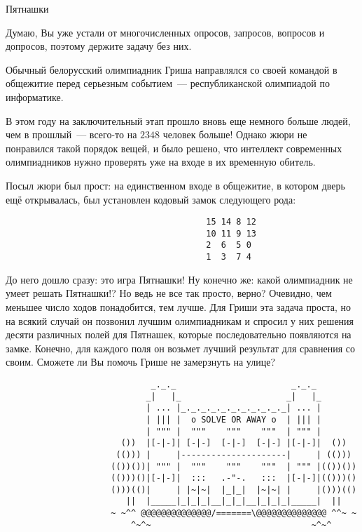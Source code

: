 \begin{problem}{Пятнашки}{}{}{}{}

Думаю, Вы уже устали от многочисленных опросов, запросов, вопросов и допросов, поэтому держите задачу без них.

Обычный белорусский олимпиадник Гриша направлялся со своей командой в общежитие перед серьезным событием~--- республиканской олимпиадой по информатике.

В этом году на заключительный этап прошло вновь еще немного больше людей, чем в прошлый~--- всего-то на $2348$ человек больше! Однако жюри не понравился такой порядок вещей, и было решено, что интеллект современных олимпиадников нужно проверять уже на входе в их временную обитель.

Посыл жюри был прост: на единственном входе в общежитие, в котором дверь ещё открывалась, был установлен кодовый замок следующего рода:


\begin{verbatim}
                                        15 14 8 12
                                        10 11 9 13
                                        2  6  5 0
                                        1  3  7 4
\end{verbatim}


До него дошло сразу: это игра Пятнашки! Ну конечно же: какой олимпиадник не умеет решать Пятнашки!? Но ведь не все так просто, верно? Очевидно, чем меньшее число ходов понадобится, тем лучше. Для Гриши эта задача проста, но на всякий случай он позвонил лучшим олимпиадникам и спросил у них решения десяти различных полей для Пятнашек, которые последовательно появляются на замке. Конечно, для каждого поля он возьмет лучший результат для сравнения со своим. Сможете ли Вы помочь Грише не замерзнуть на улице?


\begin{verbatim}
                             _._._                       _._._
                            _|   |_                     _|   |_
                            | ... |_._._._._._._._._._._| ... |
                            | ||| |  o SOLVE OR AWAY o  | ||| |
                            | """ |  """    """    """  | """ |
                       ())  |[-|-]| [-|-]  [-|-]  [-|-] |[-|-]|  ())
                      (())) |     |---------------------|     | (()))
                     (())())| """ |  """    """    """  | """ |(())())
                     (()))()|[-|-]|  :::   .-"-.   :::  |[-|-]|(()))()
                     ()))(()|     | |~|~|  |_|_|  |~|~| |     |()))(()
                        ||  |_____|_|_|_|__|_|_|__|_|_|_|_____|  ||
                     ~ ~^^ @@@@@@@@@@@@@@/=======\@@@@@@@@@@@@@@ ^^~ ~
                         ^~^~                                ~^~^
\end{verbatim}


\end{problem}
